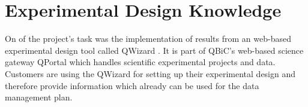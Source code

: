 \section{Experimental Design Knowledge}
On of the project's task was the implementation of results from an web-based experimental design tool called QWizard \cite{1}. It is part of QBiC's web-based science gateway QPortal which handles scientific experimental projects and data. Customers are using the QWizard for setting up their experimental design and therefore provide information which already can be used for the data management plan.